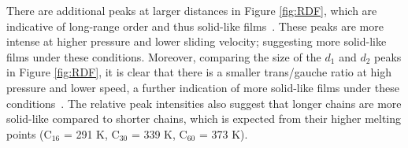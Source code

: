 \documentclass[5p]{elsarticle}
\begin{document}
There are additional peaks at larger distances in Figure \ref{fig:RDF}, which are indicative of long-range order and thus solid-like films~\cite{Tsuchiya2001,Kalyanasundaram2009}. These peaks are more intense at higher pressure and lower sliding velocity; suggesting more solid-like films under these conditions. Moreover, comparing the size of the $d_1$ and $d_2$ peaks in Figure \ref{fig:RDF}, it is clear that there is a smaller trans/gauche ratio at high pressure and lower speed, a further indication of more solid-like films under these conditions~\cite{Kavitha2007}. The relative peak intensities also suggest that longer chains are more solid-like compared to shorter chains, which is expected from their higher melting points (C$_{16}$ = 291 K, C$_{30}$ = 339 K, C$_{60}$ = 373 K).

\end{document}
